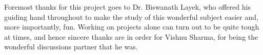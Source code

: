 \documentclass[11pt, a4paper, oneside]{Thesis} %
\title{\ttitle} %
\begin{document}
\frontmatter %


\fancyhead{} %
\rhead{\thepage} %
\lhead{} %

\pagestyle{fancy} %


\maketitle

\begin{acknowledgements}
Foremost thanks for this project goes to Dr. Biswanath Layek, who offered his guiding hand throughout to make the study of this wonderful subject easier and, more importantly, fun. Working on projects alone can turn out to be quite tough at times, and hence sincere thanks are in order for Vishnu Sharma, for being the wonderful discussions partner that he was. 
\end{acknowledgements}


\pagestyle{fancy}

	\tableofcontents %


\mainmatter %
\end{document}
